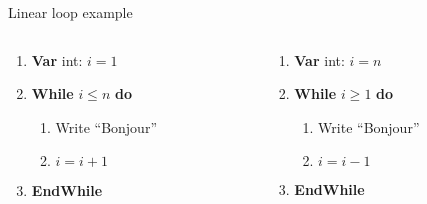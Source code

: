 \documentclass[english,10pt,table]{beamer}
\begin{document}
\begin{frame}{Linear loop example}
  \begin{columns}
  \begin{column}{0.48\textwidth}
   \begin{block}{}\small				
			\begin{enumerate}[1.]\small				
		   \item \textbf{Var} int: \alert{$i=1$}
     \item \textbf{While} \alert{$i \leq n$} \textbf{do}
					 \begin{enumerate}[1.]\small				
       \item Write ``Bonjour'' 
							\item \alert{$i = i + 1$}
						\end{enumerate}
					\item \textbf{EndWhile}
			\end{enumerate}
   \end{block}
	  \end{column}
			\pause
   \begin{column}{0.48\textwidth}
    \begin{block}{}\small				
			\begin{enumerate}[1.]\small				
		   \item \textbf{Var} int: \alert{$i=n$}
     \item \textbf{While} \alert{$i \geq 1$} \textbf{do}
					 \begin{enumerate}[1.]\small				
       \item Write ``Bonjour'' 
							\item \alert{$i = i - 1$}
						\end{enumerate}
					\item \textbf{EndWhile}
			\end{enumerate}
   \end{block}
  \end{column}
  \end{columns}
	
\end{frame}
\end{document}
